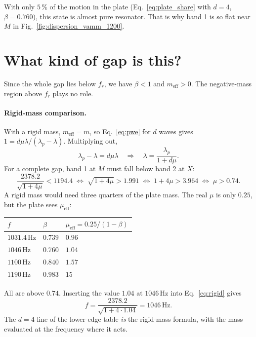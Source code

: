With only $5\,\%$ of the motion in the plate (Eq.~\eqref{eq:plate_share} with
$d=4$, $\beta = 0.760$), this state is almost pure resonator. That is why band 1
is so flat near $M$ in Fig.~\ref{fig:dispersion_vamm_1200}.

\section{What kind of gap is this?}

Since the whole gap lies below $f_r$, we have $\beta < 1$ and
$m_\mathrm{eff} > 0$. The negative-mass region above $f_r$ plays no role.

\paragraph{Rigid-mass comparison.}
With a rigid mass, $m_\mathrm{eff} = m$, so Eq.~\eqref{eq:pwe} for $d$ waves gives
$1 = d\mu\lambda/(\lambda_p - \lambda)$. Multiplying out,
\begin{equation}
  \lambda_p - \lambda = d\mu\lambda
  \quad\Longrightarrow\quad
  \lambda = \frac{\lambda_p}{1 + d\mu} .
  \label{eq:rigid}
\end{equation}
For a complete gap, band 1 at $M$ must fall below band 2 at $X$:
\begin{equation}
  \frac{2378.2}{\sqrt{1 + 4\mu}} < 1194.4
  \;\Longleftrightarrow\; \sqrt{1+4\mu} > 1.991
  \;\Longleftrightarrow\; 1 + 4\mu > 3.964
  \;\Longleftrightarrow\; \mu > 0.74 .
\end{equation}
A rigid mass would need three quarters of the plate mass. The real $\mu$ is only
$0.25$, but the plate sees $\mu_\mathrm{eff}$:
\begin{center}
\begin{tabular}{|l|l|l|}
\hline
$f$ & $\beta$ & $\mu_\mathrm{eff} = 0.25/(1-\beta)$ \\
\hline
$1031.4\,\mathrm{Hz}$ & $0.739$ & $0.96$ \\
$1046\,\mathrm{Hz}$ & $0.760$ & $1.04$ \\
$1100\,\mathrm{Hz}$ & $0.840$ & $1.57$ \\
$1190\,\mathrm{Hz}$ & $0.983$ & $15$ \\
\hline
\end{tabular}
\end{center}
All are above $0.74$. Inserting the value $1.04$ at $1046\,\mathrm{Hz}$ into
Eq.~\eqref{eq:rigid} gives
\begin{equation}
  f = \frac{2378.2}{\sqrt{1 + 4\cdot 1.04}} = 1046\,\mathrm{Hz} .
\end{equation}
The $d=4$ line of the lower-edge table \emph{is} the rigid-mass formula, with the
mass evaluated at the frequency where it acts.

